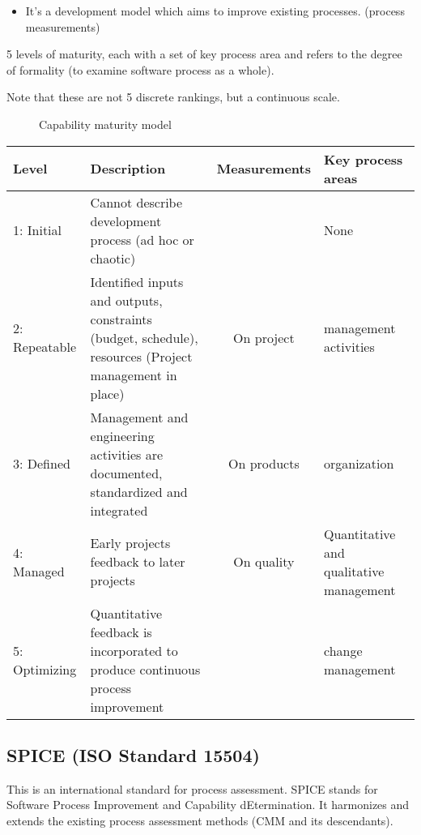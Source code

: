 \begin{itemize}
    \item It's a development model which aims to improve existing
        processes. (process measurements)
\end{itemize}

5 levels of maturity, each with a set of key process area and refers to
the degree of formality (to examine software process as a whole).

Note that these are not 5 discrete rankings, but a
continuous scale.

\begin{figure}[!ht]
    \centering
    \begin{scriptsize}
        
    \end{scriptsize}
    \caption{Capability maturity model}
\end{figure}

\begin{tabular}{l|m{}cm{}}
    \bf Level & \bf Description & \bf Measurements & \bf Key process areas \\
    \hline
    1: Initial & Cannot describe development process (ad hoc or chaotic) && None \\
    2: Repeatable & Identified inputs and outputs, constraints (budget, schedule), resources
    (Project management in place) & On project & management activities\\
    3: Defined & Management and engineering activities are documented,
    standardized and integrated & On products & organization\\
    4: Managed & Early projects feedback to later projects & On quality
    & Quantitative and qualitative management \\
    5: Optimizing & Quantitative feedback is incorporated to produce
    continuous process improvement && change management\\
\end{tabular}

\subsection{SPICE (ISO Standard 15504)}

This is an international standard for process assessment. SPICE stands for
Software Process Improvement and Capability dEtermination. It harmonizes
and extends the existing process assessment methods (CMM and its
descendants).

